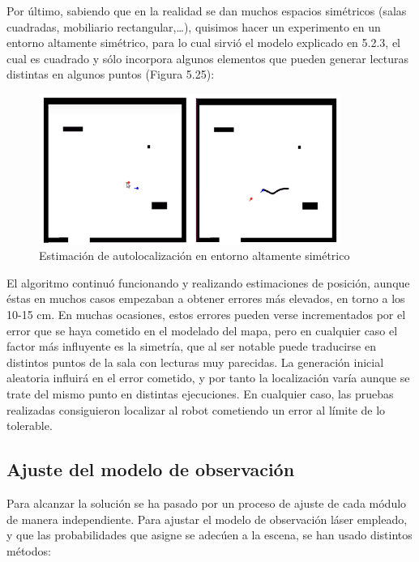 Por último, sabiendo que en la realidad se dan muchos espacios simétricos (salas cuadradas, mobiliario rectangular,…), quisimos hacer un experimento en un entorno altamente simétrico, para lo cual sirvió el modelo explicado en 5.2.3, el cual es cuadrado y sólo incorpora algunos elementos que pueden generar lecturas distintas en algunos puntos (Figura 5.25):

\begin{figure}[H]
	\begin{center}
		\includegraphics[width=0.88\textwidth]{figures/outputsimetrico.png}
		\caption{Estimación de autolocalización en entorno altamente simétrico}
		\label{fig.outputsimetrico}
		\end{center}
\end{figure}

El algoritmo continuó funcionando y realizando estimaciones de posición, aunque éstas en muchos casos empezaban a obtener errores más elevados, en torno a los 10-15 cm. En muchas ocasiones, estos errores pueden verse incrementados por el error que se haya cometido en el modelado del mapa, pero en cualquier caso el factor más influyente es la simetría, que al ser notable puede traducirse en distintos puntos de la sala con lecturas muy parecidas. La generación inicial aleatoria influirá en el error cometido, y por tanto la localización varía aunque se trate del mismo punto en distintas ejecuciones. En cualquier caso, las pruebas realizadas consiguieron localizar al robot cometiendo un error al límite de lo tolerable.

\subsection{Ajuste del modelo de observación}
Para alcanzar la solución se ha pasado por un proceso de ajuste de cada módulo de manera independiente. Para ajustar el modelo de observación láser empleado, y que las probabilidades que asigne se adecúen a la escena, se han usado distintos métodos:
\vspace{4cm}

